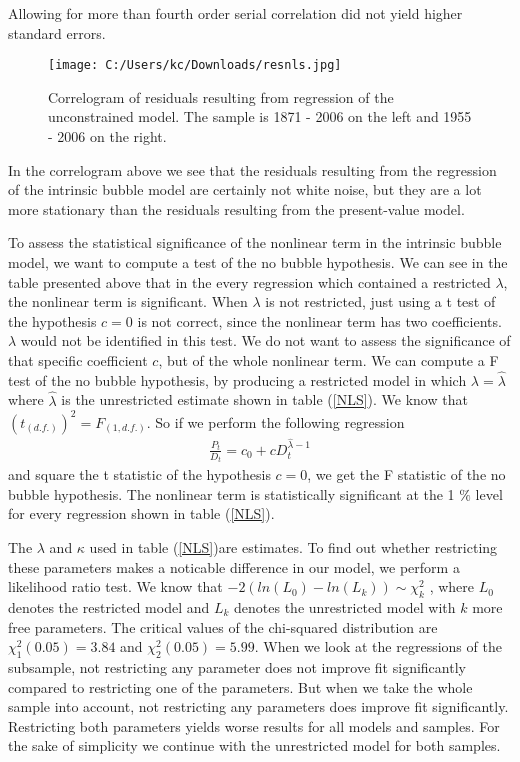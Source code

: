 \documentclass{article}
\begin{document}
Allowing for more than fourth order serial correlation did not yield higher standard errors. 

\begin{figure}[h]
	\centering
		\texttt{[image: C:/Users/kc/Downloads/resnls.jpg]}
	\caption{Correlogram of residuals resulting from regression of the unconstrained model. The sample is 1871 - 2006 on the left and 1955 - 2006 on the right.}
	\label{correlonls}
\end{figure}
In the correlogram above we see that the residuals resulting from the regression of the intrinsic bubble model are certainly not white noise, but they are a lot more stationary than the residuals resulting from the present-value model.

To assess the statistical significance of the nonlinear term in the intrinsic bubble model, we want to compute a test of the no bubble hypothesis. We can see in the table presented above that in the every regression which contained a restricted $\lambda$, the nonlinear term is significant. When $\lambda$ is not restricted, just using a t test of the hypothesis $c=0$ is not correct, since the nonlinear term has two coefficients. $\lambda$ would not be identified in this test. We do not want to assess the significance of that specific coefficient $c$, but of the whole nonlinear term. We can compute a F test of the no bubble hypothesis, by producing a restricted model in which $\lambda = \widehat{\lambda}$  where $\widehat{\lambda}$ is the unrestricted estimate shown in table (\ref{NLS}). We know that $(t_{(d.f.)})^2 = F_{(1,d.f.)}$. So if we perform the following regression
\begin{eqnarray}
\frac{P_t}{D_t} =  c_0  + c D_t^{\widehat{\lambda} - 1}
\end{eqnarray}
and square the t statistic of the hypothesis $c=0$, we get the F statistic of the no bubble hypothesis. The nonlinear term is statistically significant at the 1 $\%$ level for every regression shown in table (\ref{NLS}).  

The $\lambda$ and $\kappa$ used in table (\ref{NLS})are estimates. To find out whether restricting these parameters makes a noticable difference in our model, we perform a likelihood ratio test. We know that $-2(ln(L_0) - ln(L_k)) \sim \chi^2_k$ , where $L_0$ denotes the restricted model and $L_k$ denotes the unrestricted model with $k$ more free parameters. The critical values of the chi-squared distribution are $\chi^2_1(0.05) = 3.84$ and $\chi^2_2(0.05)=5.99$. When we look at the regressions of the subsample, not restricting any parameter does not improve fit significantly compared to restricting one of the parameters. But when we take the whole sample into account, not restricting any parameters does improve fit significantly. Restricting both parameters yields worse results for all models and samples. For the sake of simplicity we continue with the unrestricted model for both samples.
\end{document}
